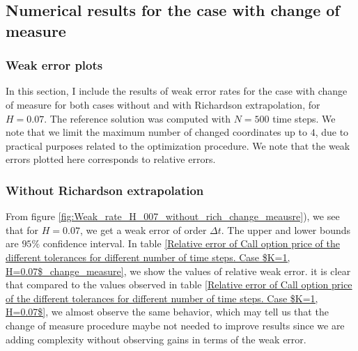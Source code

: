 \documentclass[11pt]{article}
\begin{document}
\newpage


\subsection{Numerical results for the case with change of measure}\label{sec:Numerical results for the case with change of measure}
\newpage
\subsubsection{Weak error plots} \label{sec:Weak error plots_with_change}
In this section, I include the results of weak error rates for the case with change of measure for both cases without and with Richardson extrapolation,  for $H =0.07$. The reference solution was computed with $N=500$ time steps. We note that we limit the maximum number of changed coordinates  up to $4$, due to practical purposes related to the optimization procedure.  We note that the weak errors plotted here corresponds to relative errors.


\subsubsection*{Without Richardson extrapolation}
From figure \ref{fig:Weak_rate_H_007_without_rich_change_meausre}), we see that for $H=0.07$, we get a weak error of order $\Delta t$. The upper and lower bounds are $95\%$ confidence interval. In table \ref{Relative error of Call option price of the different tolerances for different number of time steps. Case $K=1, H=0.07$_change_measure}, we show the values of relative weak error. it is clear that compared to the values observed in table \ref{Relative error of Call option price of the different tolerances for different number of time steps. Case $K=1, H=0.07$}, we almost observe the same behavior, which may tell us that the change of measure procedure maybe not needed to improve results since we are adding complexity without observing gains in terms of the weak error.
 
\end{document}
